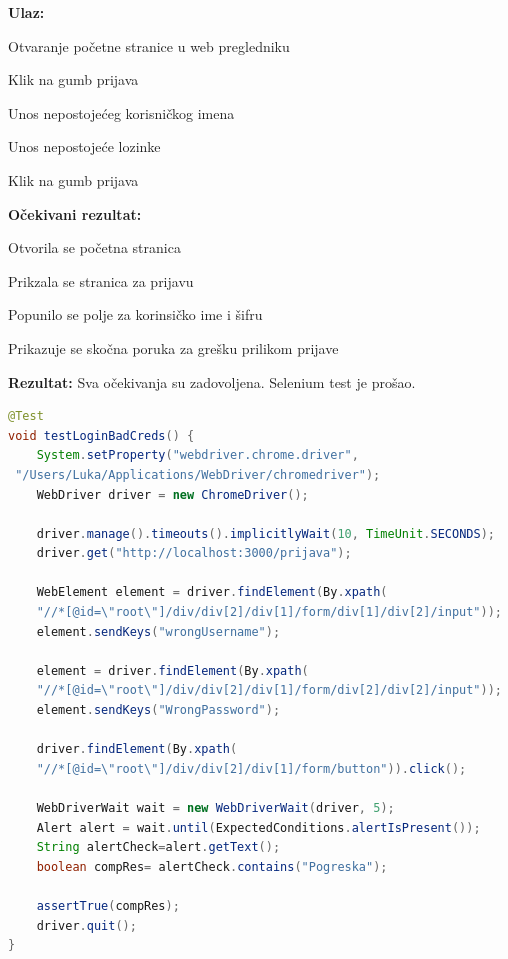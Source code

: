 			\hfill\break
			\noindent\textbf{Ulaz:}
			
			\begin{packed_enum}
				
				\item Otvaranje početne stranice u web pregledniku
			 	\item Klik na gumb prijava
			 	\item Unos nepostojećeg korisničkog imena
			 	\item Unos nepostojeće lozinke
			 	\item Klik na gumb prijava
				
			\end{packed_enum}
			
			\noindent\textbf{Očekivani rezultat:}
			
			\begin{packed_enum}
				
				\item Otvorila se početna stranica
			 	\item Prikzala se stranica za prijavu
			 	\item Popunilo se polje za korinsičko ime i šifru
			 	\item Prikazuje se skočna poruka za grešku prilikom prijave
				
			\end{packed_enum}
			
			\noindent\textbf{Rezultat:} Sva očekivanja su zadovoljena. Selenium test je prošao.
		
		\begin{lstlisting}[language=Java,caption={testLoginBadCreds},label=DescriptiveLabel]
@Test
void testLoginBadCreds() {
	System.setProperty("webdriver.chrome.driver",
 "/Users/Luka/Applications/WebDriver/chromedriver");
	WebDriver driver = new ChromeDriver();

	driver.manage().timeouts().implicitlyWait(10, TimeUnit.SECONDS);
	driver.get("http://localhost:3000/prijava");

	WebElement element = driver.findElement(By.xpath(
	"//*[@id=\"root\"]/div/div[2]/div[1]/form/div[1]/div[2]/input"));        
	element.sendKeys("wrongUsername");

	element = driver.findElement(By.xpath(
	"//*[@id=\"root\"]/div/div[2]/div[1]/form/div[2]/div[2]/input"));
	element.sendKeys("WrongPassword");

	driver.findElement(By.xpath(
	"//*[@id=\"root\"]/div/div[2]/div[1]/form/button")).click();

	WebDriverWait wait = new WebDriverWait(driver, 5);
	Alert alert = wait.until(ExpectedConditions.alertIsPresent());
	String alertCheck=alert.getText();
	boolean compRes= alertCheck.contains("Pogreska");

	assertTrue(compRes);
	driver.quit();
}

		\end{lstlisting}
		

